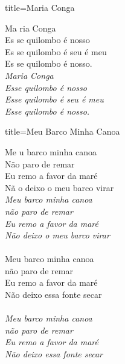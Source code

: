 \documentclass[fontsize=14pt, paper=a4, twoside, DIV=20]{scrreprt} %
\begin{document}
\begin{multicols*}{2}
\begin{song}{title={Maria Conga}}
        \begin{verse*}
            Ma ria Conga\\
            Es se quilombo é nosso\\
            Es se quilombo é seu é meu\\
            Es se quilombo é nosso.\\
            \textit{Maria Conga}\\
            \textit{Esse quilombo é nosso}\\
            \textit{Esse quilombo é seu é meu}\\
            \textit{Esse quilombo é nosso.}\\
        \end{verse*}
\end{song}

\begin{song}{title={Meu Barco Minha Canoa}}
        \begin{verse*}
            Me u barco minha canoa\\
            Não paro de remar\\
            Eu remo a favor da maré\\
            Nã o deixo o meu barco virar\\

            \textit{Meu barco minha canoa }\\
            \textit{não paro de remar}\\
            \textit{Eu remo a favor da maré}\\
            \textit{Não deixo o meu barco virar}\\
            \\
            Meu barco minha canoa\\
            não paro de remar\\
            Eu remo a favor da maré\\
            Não deixo essa fonte secar\\
            \\
            \textit{Meu barco minha canoa }\\
            \textit{não paro de remar}\\
            \textit{Eu remo a favor da maré}\\
            \textit{Não deixo essa fonte secar}\\


\end{verse*}
\end{song}
\end{multicols*}
\end{document}
